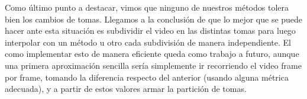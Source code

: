 Como último punto a destacar, vimos que ninguno de nuestros métodos tolera bien los cambios de tomas. Llegamos a la conclusión de que lo mejor que se puede hacer ante esta situación es subdividir el video en las distintas tomas para luego interpolar con un método u otro cada subdivisión de manera independiente. El como implementar esto de manera eficiente queda como trabajo a futuro, aunque una primera aproximación sencilla sería simplemente ir recorriendo el video frame por frame, tomando la diferencia respecto del anterior (usando alguna métrica adecuada), y a partir de estos valores armar la partición de tomas.
